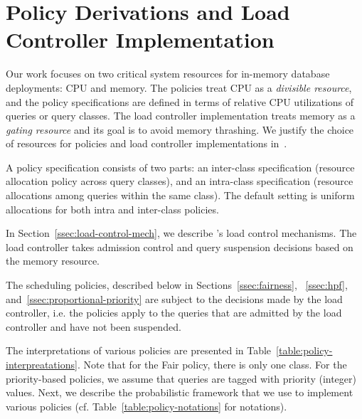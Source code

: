 \section{Policy Derivations and Load Controller Implementation}\label{sec:policy}
Our work focuses on two critical system resources for in-memory database deployments: CPU and memory. 
The policies treat CPU as a \textit{divisible resource}, and the policy specifications are defined in terms of relative CPU utilizations of queries or query classes.
The load controller implementation treats memory as a \textit{gating resource} and its goal is to avoid memory thrashing.
We justify the choice of resources for policies and load controller implementations in~\cite{supplement}.

A policy specification consists of two parts: an inter-class specification (resource allocation policy across query classes), and an intra-class specification (resource allocations among queries within the same class). 
The default setting is uniform allocations for both intra and inter-class policies. 

In Section~\ref{ssec:load-control-mech}, we describe \sys{}'s load control mechanisms. 
The load controller takes admission control and query suspension decisions based on the memory resource.

The scheduling policies, described below in Sections~\ref{ssec:fairness}, ~\ref{ssec:hpf}, and~\ref{ssec:proportional-priority} are subject to the decisions made by the load controller, i.e. the policies apply to the queries that are admitted by the load controller and have not been suspended. %


The interpretations of various policies are presented in Table~\ref{table:policy-interpreatations}.
Note that for the Fair policy, there is only one class. 
For the priority-based policies, we assume that queries are tagged with priority (integer) values. 
Next, we describe the probabilistic framework that we use to implement various policies
(cf. Table~\ref{table:policy-notations} for notations).

